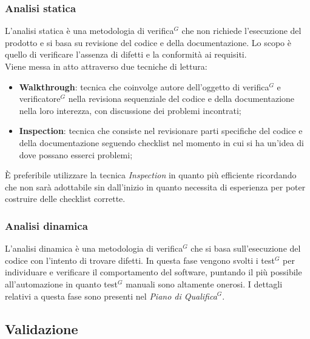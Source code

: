 \documentclass[a4paper,10pt]{article}
\begin{document}
\subsubsection{Analisi statica}
L'analisi statica è una metodologia di verifica$^G$ che non richiede l'esecuzione del prodotto e si basa su revisione del codice e della documentazione.
Lo scopo è quello di verificare l'assenza di difetti e la conformità ai requisiti. \\
Viene messa in atto attraverso due tecniche di lettura: 
\begin{itemize}
  \item \textbf{Walkthrough}: tecnica che coinvolge autore dell'oggetto di verifica$^G$ e verificatore$^G$ nella revisiona sequenziale del codice e
  della documentazione nella loro interezza, con discussione dei problemi incontrati;
  \item \textbf{Inspection}: tecnica che consiste nel revisionare parti specifiche del codice e della documentazione seguendo checklist nel momento 
  in cui si ha un'idea di dove possano esserci problemi;
\end{itemize}
È preferibile utilizzare la tecnica \textit{Inspection} in quanto più efficiente ricordando che non sarà adottabile sin dall'inizio
in quanto necessita di esperienza per poter costruire delle checklist corrette.
\subsubsection{Analisi dinamica}
L'analisi dinamica è una metodologia di verifica$^G$ che si basa sull'esecuzione del codice con l'intento di trovare difetti.
In questa fase vengono svolti i test$^G$ per individuare e verificare il comportamento del software, puntando il più possibile
all'automazione in quanto test$^G$ manuali sono altamente onerosi. I dettagli relativi a questa fase sono presenti nel \textit{Piano di Qualifica$^G$}.

\subsection{Validazione}
\end{document}
